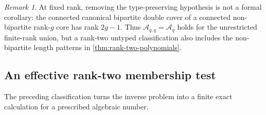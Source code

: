 \documentclass[11pt]{amsart}
\theoremstyle{plain}
\theoremstyle{definition}
\theoremstyle{remark}
\newtheorem{remark}[theorem]{Remark}
\newcommand{\cA}{\mathcal A}
\begin{document}
\begin{remark}
At fixed rank, removing the type-preserving hypothesis is not a formal
corollary: the connected canonical bipartite double cover of a connected
non-bipartite rank-\(g\) core has rank \(2g-1\).  Thus
\(\cA_{q,q}=\cA_q\) holds for the unrestricted finite-rank union, but a
rank-two untyped classification also includes the non-bipartite length
patterns in \cref{thm:rank-two-polynomials}.
\end{remark}

\subsection{An effective rank-two membership test}

The preceding classification turns the inverse problem into a finite exact
calculation for a prescribed algebraic number.
\end{document}
